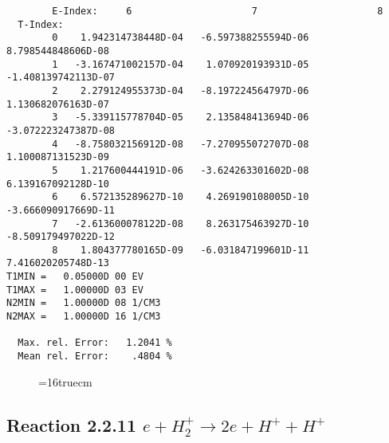 \documentclass[12pt,dvipdfmx]{article}
\begin{document}
\begin{small}
\begin{verbatim}
        E-Index:     6                     7                     8
  T-Index:
        0    1.942314738448D-04   -6.597388255594D-06    8.798544848606D-08
        1   -3.167471002157D-04    1.070920193931D-05   -1.408139742113D-07
        2    2.279124955373D-04   -8.197224564797D-06    1.130682076163D-07
        3   -5.339115778704D-05    2.135848413694D-06   -3.072223247387D-08
        4   -8.758032156912D-08   -7.270955072707D-08    1.100087131523D-09
        5    1.217600444191D-06   -3.624263301602D-08    6.139167092128D-10
        6    6.572135289627D-10    4.269190108005D-10   -3.666090917669D-11
        7   -2.613600078122D-08    8.263175463927D-10   -8.509179497022D-12
        8    1.804377780165D-09   -6.031847199601D-11    7.416020205748D-13
T1MIN =   0.05000D 00 EV
T1MAX =   1.00000D 03 EV
N2MIN =   1.00000D 08 1/CM3
N2MAX =   1.00000D 16 1/CM3

  Max. rel. Error:   1.2041 %
  Mean rel. Error:    .4804 %
\end{verbatim}\end{small}
\begin{figure} \label{2.2.10}
\epsfxsize=16truecm
\end{figure}
\newpage



\subsection{
Reaction 2.2.11   $e + H_2^+      \rightarrow 2e + H^+ + H^+ $
}
\end{document}
